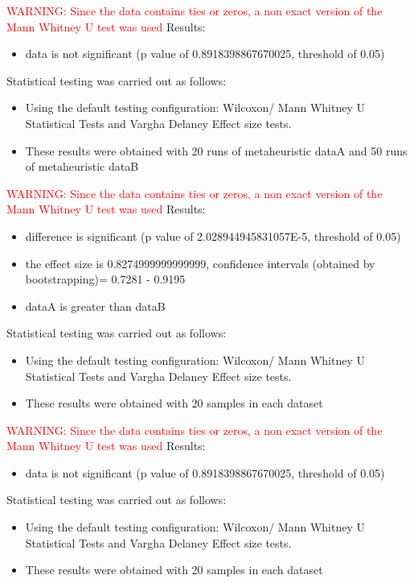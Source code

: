 \documentclass[]{article}
\begin{document}
\textcolor{Red}{WARNING: Since the data contains ties or zeros, a non exact version of the Mann Whitney U test was used}
Results:
\begin{itemize}
\item{data is not significant (p value of 0.8918398867670025, threshold of 0.05)}
\end{itemize}Statistical testing was carried out as follows: \begin{itemize}
\item{Using the default testing configuration: Wilcoxon/ Mann Whitney U Statistical Tests and Vargha Delaney Effect size tests.}
\item{These results were obtained with 20 runs of metaheuristic dataA and 50 runs of metaheuristic dataB}
\end{itemize}
\textcolor{Red}{WARNING: Since the data contains ties or zeros, a non exact version of the Mann Whitney U test was used}
Results:
\begin{itemize}
\item{difference is significant (p value of 2.028944945831057E-5, threshold of 0.05)}
\item{the effect size is 0.8274999999999999, confidence intervals (obtained by bootstrapping)= 0.7281 - 0.9195}
\item{dataA is greater than dataB}
\end{itemize}Statistical testing was carried out as follows: \begin{itemize}
\item{Using the default testing configuration: Wilcoxon/ Mann Whitney U Statistical Tests and Vargha Delaney Effect size tests.}
\item{These results were obtained with 20 samples in each dataset}
\end{itemize}
\textcolor{Red}{WARNING: Since the data contains ties or zeros, a non exact version of the Mann Whitney U test was used}
Results:
\begin{itemize}
\item{data is not significant (p value of 0.8918398867670025, threshold of 0.05)}
\end{itemize}Statistical testing was carried out as follows: \begin{itemize}
\item{Using the default testing configuration: Wilcoxon/ Mann Whitney U Statistical Tests and Vargha Delaney Effect size tests.}
\item{These results were obtained with 20 samples in each dataset}
\end{itemize}
\end{document}
